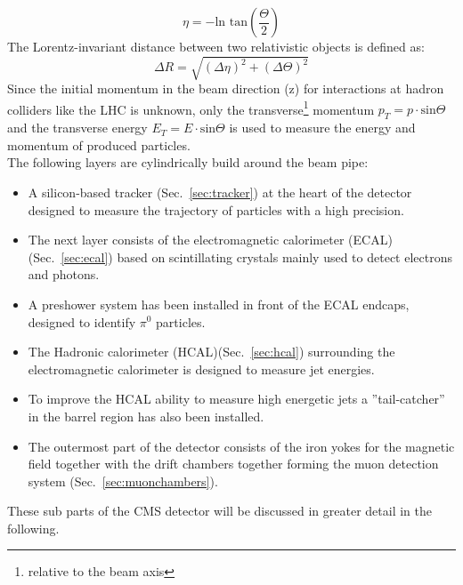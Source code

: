 $$ \eta = - \text{ln tan}\left(\frac{\Theta}{2}\right)  $$
The Lorentz-invariant distance between two relativistic objects is defined as:
$$ \Delta R= \sqrt{(\Delta\eta)^2+(\Delta\Theta)^2} $$
Since the initial momentum in the beam direction (z) for interactions at hadron colliders like the LHC is unknown, only the transverse\footnote{relative to the beam axis} momentum $p_T =p \cdot \text{sin}\Theta$ and the transverse energy $E_T = E \cdot \text{sin}\Theta$ is used to measure the energy and momentum of produced particles.\\
The following layers are cylindrically build around the beam pipe:
\begin{itemize}
 \item A silicon-based tracker (Sec.~\ref{sec:tracker}) at the heart of the detector designed to measure the trajectory of particles with a high precision.
 \item The next layer consists of the electromagnetic calorimeter (ECAL)(Sec.~\ref{sec:ecal}) based on scintillating crystals mainly used to detect electrons and photons.
 \item A preshower system has been installed in front of the ECAL endcaps, designed to identify $\pi^0$ particles.
 \item The Hadronic calorimeter (HCAL)(Sec.~\ref{sec:hcal}) surrounding the electromagnetic calorimeter is designed to measure jet energies.
 \item To improve the HCAL ability to measure high energetic jets a ''tail-catcher'' in the barrel region has also been installed.
 \item The outermost part of the detector consists of the iron yokes for the magnetic field together with the drift chambers together forming the muon detection system (Sec.~\ref{sec:muonchambers}).
\end{itemize}
These sub parts of the CMS detector will be discussed in greater detail in the following.
\clearpage


